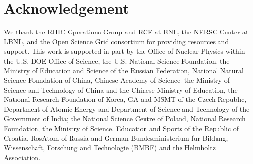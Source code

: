 \documentclass[%
 reprint,	
showpacs,
 amsmath,amssymb,
 aps,
 prc,
]{revtex4-1}
\providecommand{\DIFaddtex}[1]{{\protect\color{blue}\uwave{#1}}} %
\providecommand{\DIFdeltex}[1]{{\protect\color{red}\sout{#1}}}                      %
\providecommand{\DIFaddbegin}{} %
\providecommand{\DIFaddend}{} %
\providecommand{\DIFdelbegin}{} %
\providecommand{\DIFdelend}{} %
\providecommand{\DIFadd}[1]{\texorpdfstring{\DIFaddtex{#1}}{#1}} %
\providecommand{\DIFdel}[1]{\texorpdfstring{\DIFdeltex{#1}}{}} %
\begin{document}
\section{Acknowledgement}
\label{acknowledgement}

We thank the RHIC Operations Group and RCF at BNL, the NERSC Center at LBNL, and the Open Science Grid consortium for providing resources and support. This work is supported in part by the Office of Nuclear Physics within the U.S. DOE Office of Science, the U.S. National Science Foundation, the Ministry of Education and Science of the Russian Federation, National Natural Science Foundation of China, Chinese Academy of Science, the Ministry of Science and Technology of China and the Chinese Ministry of Education, the National Research Foundation of Korea, GA and MSMT of the Czech Republic, Department of Atomic Energy and Department of Science and Technology of the Government of India; the National Science Centre of Poland, National Research Foundation, the Ministry of Science, Education and Sports of the Republic of Croatia, RosAtom of Russia and German Bundesministerium \DIFdelbegin \DIFdel{fur }\DIFdelend \DIFaddbegin \DIFadd{f}{\DIFadd{\"u}}\DIFadd{r }\DIFaddend Bildung, Wissenschaft, Forschung and Technologie (BMBF) and the Helmholtz Association.


\end{document}
